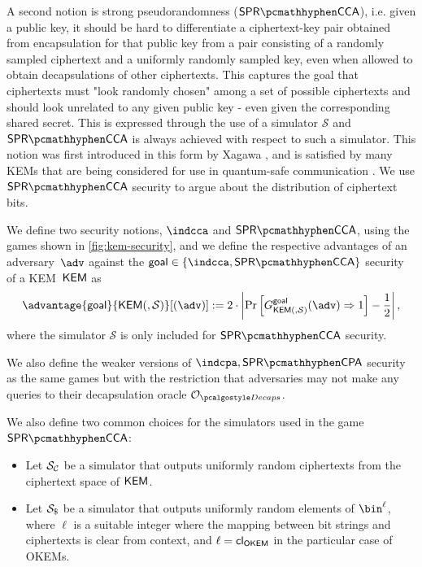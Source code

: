 A second notion is strong pseudorandomness ($\sprcca$), i.e. given a public key, it should be hard to differentiate a ciphertext-key pair obtained from encapsulation for that public key from a pair consisting of a randomly sampled ciphertext and a uniformly randomly sampled key, even when allowed to obtain decapsulations of other ciphertexts.
This captures the goal that ciphertexts must "look randomly chosen" among a set of possible ciphertexts and should look unrelated to any given public key - even given the corresponding shared secret.
This is expressed through the use of a simulator $\mathcal S$ and $\sprcca$ is always achieved with respect to such a simulator.
This notion was first introduced in this form by Xagawa \cite{EC:Xagawa22}, and is satisfied by many KEMs that are being considered for use in quantum-safe communication \cite{EC:Xagawa22}. We use $\sprcca$ security to argue about the distribution of ciphertext bits.

\begin{definition} \label{def:kem-security}
    We define two security notions, $\indcca$ and $\sprcca$, using the games shown in \cref{fig:kem-security}, and we define the respective advantages of an adversary~$\adv$ against the $\mathsf{goal} \in \{\indcca, \sprcca\}$ security of a KEM~$\mathsf{KEM}$ as
    \[
        \advantage{\mathsf{goal}}{\KEM(, \mathcal{S})}[(\adv)] := 2 \cdot \left| \Pr \left[ G^{\mathsf{goal}}_{\KEM(, \mathcal{S})}(\adv) \Rightarrow 1 \right] - \frac{1}{2} \right|,
    \]
    where the simulator $\mathcal{S}$ is only included for $\sprcca$ security.

    We also define the weaker versions of $\indcpa,\sprcpa$ security as the same games but with the restriction that adversaries may not make any queries to their decapsulation oracle $\decapsoracle$.

    We also define two common choices for the simulators used in the game $\sprcca$: \begin{itemize}
        \item Let $\mathcal{S}_\mathcal{C}$ be a simulator that outputs uniformly random ciphertexts from the ciphertext space of $\mathsf{KEM}$.
        \item Let $\simulbin$ be a simulator that outputs uniformly random elements of $\bin^\ell$, where $\ell$ is a suitable integer where the mapping between bit strings and ciphertexts is clear from context, and $\ell = \mathsf{cl}_{\mathsf{OKEM}}$ in the particular case of OKEMs.
    \end{itemize}
\end{definition}

